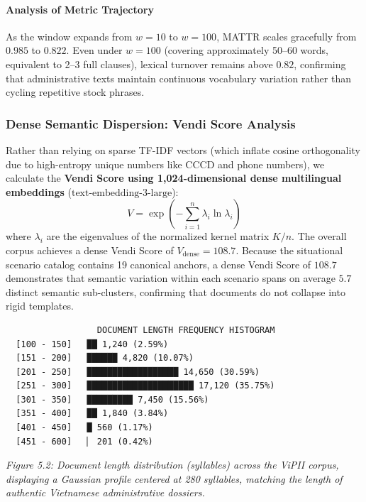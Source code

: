 \documentclass[
]{article}
\begin{document}
\paragraph{Analysis of Metric
Trajectory}\label{analysis-of-metric-trajectory}

As the window expands from \(w=10\) to \(w=100\), MATTR scales
gracefully from \(0.985\) to \(0.822\). Even under \(w=100\) (covering
approximately 50--60 words, equivalent to 2--3 full clauses), lexical
turnover remains above \(0.82\), confirming that administrative texts
maintain continuous vocabulary variation rather than cycling repetitive
stock phrases.

\subsubsection{Dense Semantic Dispersion: Vendi Score
Analysis}\label{dense-semantic-dispersion-vendi-score-analysis}

Rather than relying on sparse TF-IDF vectors (which inflate cosine
orthogonality due to high-entropy unique numbers like CCCD and phone
numbers), we calculate the \textbf{Vendi Score using 1,024-dimensional
dense multilingual embeddings} (\(\text{text-embedding-3-large}\)):
\[V = \exp\left(-\sum_{i=1}^n \lambda_i \ln \lambda_i\right)\] where
\(\lambda_i\) are the eigenvalues of the normalized kernel matrix
\(K/n\). The overall corpus achieves a dense Vendi Score of
\textbf{\(V_{\text{dense}} = 108.7\)}. Because the situational scenario
catalog contains 19 canonical anchors, a dense Vendi Score of \(108.7\)
demonstrates that semantic variation within each scenario spans on
average \(5.7\) distinct semantic sub-clusters, confirming that
documents do not collapse into rigid templates.

\begin{verbatim}
                  DOCUMENT LENGTH FREQUENCY HISTOGRAM
  [100 - 150]   ██ 1,240 (2.59%)
  [151 - 200]   ██████ 4,820 (10.07%)
  [201 - 250]   ██████████████████ 14,650 (30.59%)
  [251 - 300]   █████████████████████ 17,120 (35.75%)
  [301 - 350]   █████████ 7,450 (15.56%)
  [351 - 400]   ██ 1,840 (3.84%)
  [401 - 450]   █ 560 (1.17%)
  [451 - 600]   ▏ 201 (0.42%)
\end{verbatim}

\emph{Figure 5.2: Document length distribution (syllables) across the
ViPII corpus, displaying a Gaussian profile centered at 280 syllables,
matching the length of authentic Vietnamese administrative dossiers.}
\end{document}
